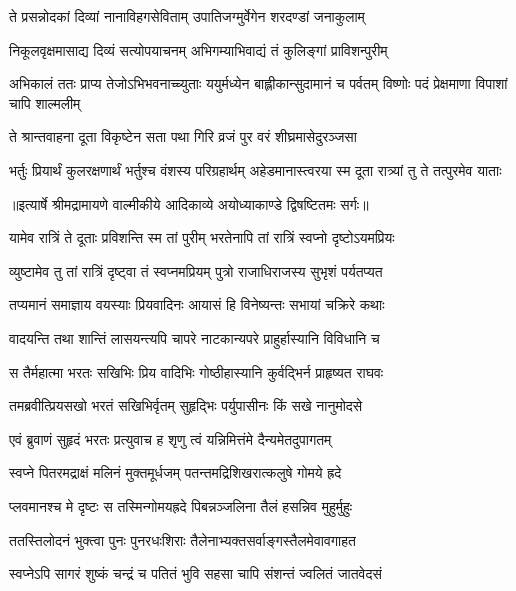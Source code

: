\twolineshloka
{ते प्रसन्नोदकां दिव्यां नानाविहगसेविताम्}
{उपातिजग्मुर्वेगेन शरदण्डां जनाकुलाम्} %

\twolineshloka
{निकूलवृक्षमासाद्य दिव्यं सत्योपयाचनम्}
{अभिगम्याभिवाद्यं तं कुलिङ्गां प्राविशन्पुरीम्} %

\threelineshloka
{अभिकालं ततः प्राप्य तेजोऽभिभवनाच्च्युताः}
{ययुर्मध्येन बाह्लीकान्सुदामानं च पर्वतम्}
{विष्णोः पदं प्रेक्षमाणा विपाशां चापि शाल्मलीम्} %

\twolineshloka
{ते श्रान्तवाहना दूता विकृष्टेन सता पथा}
{गिरि व्रजं पुर वरं शीघ्रमासेदुरञ्जसा} %

\fourlineindentedshloka
{भर्तुः प्रियार्थं कुलरक्षणार्थं}
{ भर्तुश्च वंशस्य परिग्रहार्थम्}
{अहेडमानास्त्वरया स्म दूता}
{ रात्र्यां तु ते तत्पुरमेव याताः} %


{॥इत्यार्षे श्रीमद्रामायणे वाल्मीकीये आदिकाव्ये अयोध्याकाण्डे द्विषष्टितमः सर्गः॥}


\twolineshloka
{यामेव रात्रिं ते दूताः प्रविशन्ति स्म तां पुरीम्}
{भरतेनापि तां रात्रिं स्वप्नो दृष्टोऽयमप्रियः} %

\twolineshloka
{व्युष्टामेव तु तां रात्रिं दृष्ट्वा तं स्वप्नमप्रियम्}
{पुत्रो राजाधिराजस्य सुभृशं पर्यतप्यत} %

\twolineshloka
{तप्यमानं समाज्ञाय वयस्याः प्रियवादिनः}
{आयासं हि विनेष्यन्तः सभायां चक्रिरे कथाः} %

\twolineshloka
{वादयन्ति तथा शान्तिं लासयन्त्यपि चापरे}
{नाटकान्यपरे प्राहुर्हास्यानि विविधानि च} %

\twolineshloka
{स तैर्महात्मा भरतः सखिभिः प्रिय वादिभिः}
{गोष्ठीहास्यानि कुर्वद्भिर्न प्राहृष्यत राघवः} %

\twolineshloka
{तमब्रवीत्प्रियसखो भरतं सखिभिर्वृतम्}
{सुहृद्भिः पर्युपासीनः किं सखे नानुमोदसे} %

\twolineshloka
{एवं ब्रुवाणं सुहृदं भरतः प्रत्युवाच ह}
{शृणु त्वं यन्निमित्तंमे दैन्यमेतदुपागतम्} %

\twolineshloka
{स्वप्ने पितरमद्राक्षं मलिनं मुक्तमूर्धजम्}
{पतन्तमद्रिशिखरात्कलुषे गोमये ह्रदे} %

\twolineshloka
{प्लवमानश्च मे दृष्टः स तस्मिन्गोमयह्रदे}
{पिबन्नञ्जलिना तैलं हसन्निव मुहुर्मुहुः} %

\twolineshloka
{ततस्तिलोदनं भुक्त्वा पुनः पुनरधःशिराः}
{तैलेनाभ्यक्तसर्वाङ्गस्तैलमेवावगाहत} %

\twolineshloka
{स्वप्नेऽपि सागरं शुष्कं चन्द्रं च पतितं भुवि}
{सहसा चापि संशन्तं ज्वलितं जातवेदसं} %

